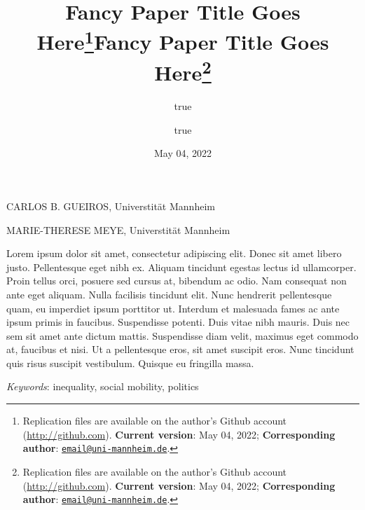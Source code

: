 \documentclass[
  11pt,
]{article}
\title{Fancy Paper Title Goes Here\thanks{Replication files are
available on the author's Github account (\url{http://github.com}).
\textbf{Current version}: May 04, 2022; \textbf{Corresponding author}:
\href{mailto:email@uni-mannheim.de}{\nolinkurl{email@uni-mannheim.de}}.}}
\author{true \and true}
\date{May 04, 2022}
\title{Fancy Paper Title Goes Here\thanks{Replication files are
available on the author's Github account (\url{http://github.com}).
\textbf{Current version}: May 04, 2022; \textbf{Corresponding author}:
\href{mailto:email@uni-mannheim.de}{\nolinkurl{email@uni-mannheim.de}}.}  }
\date{}
\renewenvironment{abstract}
 {{%
    \setlength{\leftmargin}{0mm}
    \setlength{\rightmargin}{\leftmargin}%
  }%
  \relax}
 {\endlist}
\begin{document}



{%
\setlength{\parindent}{0pt}
\thispagestyle{plain}
{%
\maketitle  %

}




{
   \vskip 13.5pt\relax \normalsize\fontsize{11}{12}
   \MakeUppercase{Carlos B. Gueiros}, \small{Universtität
Mannheim}   \par \vskip -3.5pt \MakeUppercase{Marie-Therese
Meye}, \small{Universtität Mannheim}   

}

}








\begin{abstract}


    \vskip 8.5pt %

\noindent \small{Lorem ipsum dolor sit amet, consectetur adipiscing
elit. Donec sit amet libero justo. Pellentesque eget nibh ex. Aliquam
tincidunt egestas lectus id ullamcorper. Proin tellus orci, posuere sed
cursus at, bibendum ac odio. Nam consequat non ante eget aliquam. Nulla
facilisis tincidunt elit. Nunc hendrerit pellentesque quam, eu imperdiet
ipsum porttitor ut. Interdum et malesuada fames ac ante ipsum primis in
faucibus. Suspendisse potenti. Duis vitae nibh mauris. Duis nec sem sit
amet ante dictum mattis. Suspendisse diam velit, maximus eget commodo
at, faucibus et nisi. Ut a pellentesque eros, sit amet suscipit eros.
Nunc tincidunt quis risus suscipit vestibulum. Quisque eu fringilla
massa.}


\vskip 8.5pt \noindent \emph{Keywords}: inequality, social mobility,
politics \par




\end{abstract}
\end{document}

